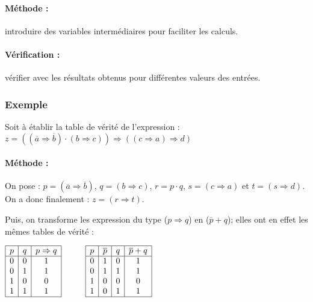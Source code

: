 \paragraph{Méthode :} introduire des variables intermédiaires pour faciliter les calculs.

\paragraph{Vérification :} vérifier avec \python{} les résultats obtenus pour 
différentes valeurs des entrées.

\newpage
\subsubsection{Exemple}
Soit à établir la table de vérité de l'expression :
$z = ((\overline{a} \Rightarrow \overline{b}) \cdot (b \Rightarrow c)) \Rightarrow (({c} \Rightarrow {a}) \Rightarrow d)$

\paragraph{Méthode :}
On pose : $p = (\overline{a} \Rightarrow \overline{b})$, $q = (b \Rightarrow c)$, $r = p\cdot q$,
$s = ({c} \Rightarrow {a})$ et $t = (s \Rightarrow d)$. On a donc finalement : $z = (r \Rightarrow t)$.

Puis, on transforme les expression du type ($p \Rightarrow q$) en ($\overline{p}+q$); 
elles ont en effet les mêmes tables de vérité :\\
\centerline{$\begin{array}[t]{|c|c|c|}
\hline
p & q & {p \Rightarrow q}\\
\hline
0 & 0 & 1\\
0 & 1 & 1\\
1 & 0 & 0\\
1 & 1 & 1\\
\hline
\end{array}
\hspace*{1cm}
\begin{array}[t]{|c|c|c|c|}
\hline
p & \overline{p} & q & {\overline{p} + q}\\
\hline
0 & 1 & 0 & 1\\
0 & 1 & 1 & 1\\
1 & 0 & 0 & 0\\
1 & 0 & 1 & 1\\
\hline
\end{array}$}

